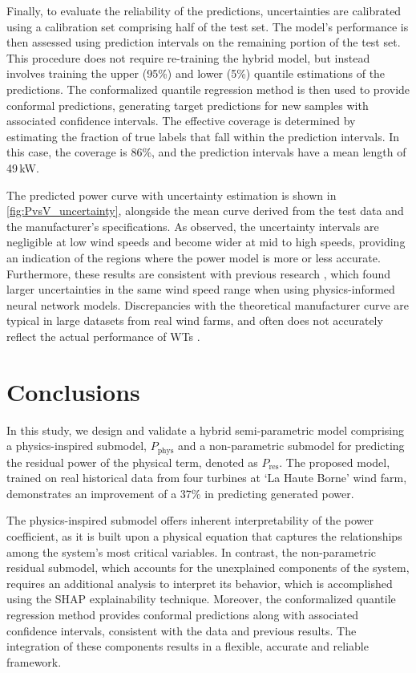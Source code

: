 \documentclass[preprint,12pt]{elsarticle}
\begin{document}
Finally, to evaluate the reliability of the predictions, uncertainties are calibrated using a calibration set comprising half of the test set. The model's performance is then assessed using prediction intervals on the remaining portion of the test set. This procedure does not require re-training the hybrid model, but instead involves training the upper (95\%) and lower (5\%) quantile estimations of the predictions. The conformalized quantile regression method is then used to provide conformal predictions, generating target predictions for new samples with associated confidence intervals. The effective coverage is determined by estimating the fraction of true labels that fall within the prediction intervals. In this case, the coverage is 86\%, and the prediction intervals have a mean length of 49\,kW.

The predicted power curve with uncertainty estimation is shown in \autoref{fig:PvsV_uncertainty}, alongside the mean curve derived from the test data and the manufacturer's specifications. As observed, the uncertainty intervals are negligible at low wind speeds and become wider at mid to high speeds, providing an indication of the regions where the power model is more or less accurate. Furthermore, these results are consistent with previous research \cite{Gijon2023}, which found larger uncertainties in the same wind speed range when using physics-informed neural network models. Discrepancies with the theoretical manufacturer curve are typical in large datasets from real wind farms, and often does not accurately reflect the actual performance of WTs \cite{WT_power_curve,PAGNINI2015,YAN2019}.

\section{Conclusions}\label{sec:conclusions}
In this study, we design and validate a hybrid semi-parametric model comprising a physics-inspired submodel, $P_\text{phys}$ and a non-parametric submodel for predicting the residual power of the physical term, denoted as $P_\text{res}$. The proposed model, trained on real historical data from four turbines at `La Haute Borne' wind farm, demonstrates an improvement of a 37\% in predicting generated power.

The physics-inspired submodel offers inherent interpretability of the power coefficient, as it is built upon a physical equation that captures the relationships among the system’s most critical variables. In contrast, the non-parametric residual submodel, which accounts for the unexplained components of the system, requires an additional analysis to interpret its behavior, which is accomplished using the SHAP explainability technique. Moreover, the conformalized quantile regression method provides conformal predictions along with associated confidence intervals, consistent with the data and previous results. The integration of these components results in a flexible, accurate and reliable framework.
\end{document}
